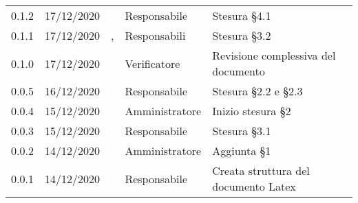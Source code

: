 {\begin{longtable}{c C{2.6cm} C{3cm} C{2.6cm} C{5cm}}
0.1.2 & 17/12/2020 & \SG{} & Responsabile & Stesura \S 4.1 \\

0.1.1 & 17/12/2020 & \SG{},\newline \BM{} & Responsabili & Stesura \S 3.2 \\

0.1.0 & 17/12/2020 & \ZM{} & Verificatore & Revisione complessiva del documento \\

0.0.5 & 16/12/2020 & \BM{} & Responsabile & Stesura \S 2.2 e \S 2.3 \\
		
0.0.4 & 15/12/2020 & \PA{} & Amministratore & Inizio stesura \S 2 \\

0.0.3 & 15/12/2020 & \SG{} & Responsabile & Stesura \S 3.1 \\

0.0.2 & 14/12/2020 & \PA{} & Amministratore & Aggiunta \S 1 \\

0.0.1 & 14/12/2020 & \SG{} & Responsabile & Creata struttura del documento Latex \\
		
\end{longtable}
}
